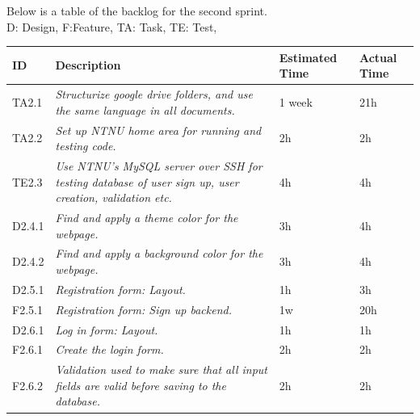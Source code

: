 Below is a table of the backlog for the second sprint. \\ D: Design, F:Feature, TA: Task, TE: Test, 

\begin{minipage}{\linewidth}
\setlength{\tabcolsep}{12pt}
\centering
{}
\begin{tabular}{|p{1cm}|p{4cm}|p{2cm}|p{2cm}|}
\hline
\cellcolor{gray!25} ID & \cellcolor{gray!25} Description & \cellcolor{gray!25} Estimated Time & \cellcolor{gray!25} Actual Time \\
\hline
TA2.1 & \it{Structurize google drive folders, and use the same language in all documents.} & 1 week & 21h \\
TA2.2 & \it{Set up NTNU home area for running and testing code.} & 2h & 2h \\
TE2.3 & \it{Use NTNU's MySQL server over SSH for testing database of user sign up, user creation, validation etc. } & 4h & 4h \\
D2.4.1 & \it{Find and apply a theme color for the webpage. } & 3h & 4h \\
D2.4.2 & \it{Find and apply a background color for the webpage.} & 3h & 4h \\
D2.5.1 & \it{Registration form: Layout.} & 1h & 3h \\
F2.5.1 & \it{Registration form: Sign up backend.} & 1w & 20h \\
D2.6.1 & \it{Log in form: Layout.} & 1h & 1h \\
F2.6.1 & \it{Create the login form.} & 2h & 2h \\
F2.6.2 & \it{Validation used to make sure that all input fields are valid before saving to the database. } & 2h & 2h\\
\hline
\end{tabular}
\end{minipage}

